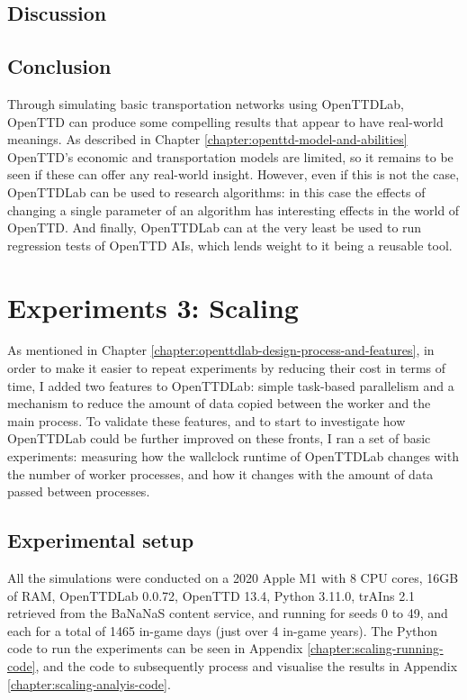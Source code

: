 \documentclass[logo,msc,dsti]{style/infthesis}    %
\begin{document}
{\section{Discussion}

\section{Conclusion}

Through simulating basic transportation networks using OpenTTDLab, OpenTTD can produce some compelling results that appear to have real-world meanings. As described in Chapter \ref{chapter:openttd-model-and-abilities} OpenTTD's economic and transportation models are limited, so it remains to be seen if these can offer any real-world insight. However, even if this is not the case, OpenTTDLab can be used to research algorithms: in this case the effects of changing a single parameter of an algorithm has interesting effects in the world of OpenTTD. And finally, OpenTTDLab can at the very least be used to run regression tests of OpenTTD AIs, which lends weight to it being a reusable tool.

\chapter{Experiments 3: Scaling}
\label{chapter:experiments-scaling}

As mentioned in Chapter \ref{chapter:openttdlab-design-process-and-features}, in order to make it easier to repeat experiments by reducing their cost in terms of time, I added two features to OpenTTDLab: simple task-based parallelism and a mechanism to reduce the amount of data copied between the worker and the main process. To validate these features, and to start to investigate how OpenTTDLab could be further improved on these fronts, I ran a set of basic experiments: measuring how the wallclock runtime of OpenTTDLab changes with the number of worker processes, and how it changes with the amount of data passed between processes.

\section{Experimental setup}

All the simulations were conducted on a 2020 Apple M1 with 8 CPU cores, 16GB of RAM, OpenTTDLab 0.0.72, OpenTTD 13.4, Python 3.11.0, trAIns 2.1 retrieved from the BaNaNaS content service, and running for seeds 0 to 49, and each for a total of 1465 in-game days (just over 4 in-game years). The Python code to run the experiments can be seen in Appendix \ref{chapter:scaling-running-code}, and the code to subsequently process and visualise the results in Appendix \ref{chapter:scaling-analyis-code}.

}
\end{document}
